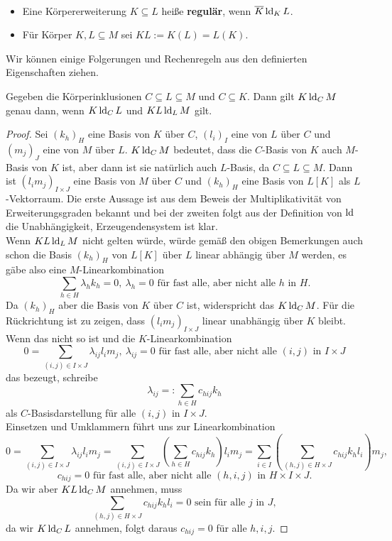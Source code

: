     \begin{definition}
    	\ 
    	\begin{itemize}
    		\item Eine Körpererweiterung $K\subseteq L$ heiße \textbf{regulär}, wenn $\overline{K}\operatorname{ld}_KL$.
    		\item Für Körper $K,L\subseteq M$ sei $KL:=K(L)=L(K)$.
    	\end{itemize}
    \end{definition}
    
    Wir können einige Folgerungen und \glqq{}Rechenregeln\grqq{} aus den definierten Eigenschaften ziehen.
    
    \begin{lemma}\label{Stapellemma}
    	Gegeben die Körperinklusionen $C\subseteq L\subseteq M$ und $C\subseteq K$. Dann gilt $K\operatorname{ld}_CM$ genau dann, wenn $K\operatorname{ld}_CL$ und $KL\operatorname{ld}_LM$ gilt.
    \end{lemma}
    \begin{proof}
    	Sei $(k_h)_H$ eine Basis von $K$ über $C$, $(l_i)_I$ eine von $L$ über $C$ und $(m_j)_J$ eine von $M$ über $L$. $K\operatorname{ld}_CM$ bedeutet, dass die $C$-Basis von $K$ auch $M$-Basis von $K$ ist, aber dann ist sie natürlich auch $L$-Basis, da $C\subseteq L\subseteq M$. Dann ist $(l_im_j)_{I\times J}$ eine Basis von $M$ über $C$ und $(k_h)_H$ eine Basis von $L[K]$ als $L$-Vektorraum. Die erste Aussage ist aus dem Beweis der Multiplikativität von Erweiterungsgraden bekannt und bei der zweiten folgt aus der Definition von $\operatorname{ld}$ die Unabhängigkeit, Erzeugendensystem ist klar.\\
    	Wenn $KL\operatorname{ld}_LM$ nicht gelten würde, würde gemäß den obigen Bemerkungen auch schon die Basis $(k_h)_H$ von $L[K]$ über $L$ linear abhängig über $M$ werden, es gäbe also eine $M$-Linearkombination $$\sum\limits_{h\in H}\lambda_hk_h=0,\ \lambda_h=0\text{ für fast alle, aber nicht alle } h\text{ in }H.$$
    	Da $(k_h)_H$ aber die Basis von $K$ über $C$ ist, widerspricht das $K\operatorname{ld}_CM$.\newpage
    	Für die Rückrichtung ist zu zeigen, dass $(l_im_j)_{I\times J}$ linear unabhängig über $K$ bleibt. Wenn das nicht so ist und die $K$-Linearkombination $$0=\sum\limits_{(i,j)\in I\times J}\lambda_{ij}l_im_j,\  \lambda_{ij}=0\text{ für fast alle, aber nicht alle } (i,j)\text{ in }I\times J$$ das bezeugt, schreibe $$\lambda_{ij}=:\sum\limits_{h\in H}c_{hij}k_h$$ als $C$-Basisdarstellung für alle $(i,j)$ in $I\times J$.\\
    	Einsetzen und Umklammern führt uns zur Linearkombination $$0=\sum\limits_{(i,j)\in I\times J}\lambda_{ij}l_im_j=\sum\limits_{(i,j)\in I\times J}\left(\sum\limits_{h\in H} c_{hij}k_h\right)l_im_j=\sum\limits_{i\in I}\left(\sum\limits_{(h,j)\in H\times J}c_{hij}k_hl_i\right)m_j,$$ $$c_{hij}=0\text{ für fast alle, aber nicht alle } (h,i,j)\text{ in }H\times I\times J.$$
    	Da wir aber $KL\operatorname{ld}_CM$ annehmen, muss $$\sum\limits_{(h,j)\in H\times J}c_{hij}k_hl_i=0\text{ sein für alle }j\text{ in }J,$$ da wir $K\operatorname{ld}_CL$ annehmen, folgt daraus $c_{hij}=0$ für alle $h,i,j$.
    \end{proof}
    
